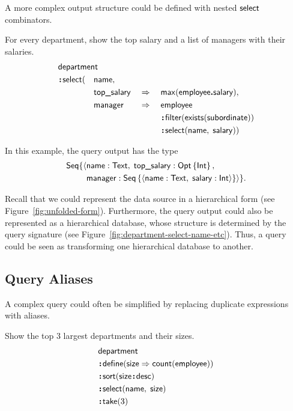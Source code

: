 A more complex output structure could be defined with nested $\textup{\textsf{select}}$ combinators.

\begin{demo}
    \label{ex:department-select-name-etc}
    For every department, show the top salary and a list of managers with their
    salaries.
    \begin{alignat*}{4}
        & \Department\hidewidth && && && \\
        & \Apply\Select( && \Name, && && \\
            & && \TopSalary && \As\; && \Max(\Employee\To\Salary), \\
            & && \Manager && \As\; && \Employee \\
            & && && && \Apply\Filter(\Exists(\Subordinate)) \\
            & && && && \Apply\Select(\Name,\; \Salary))
    \end{alignat*}
\end{demo}

In this example, the query output has the type
\begin{align*}
    \textup{\textsf{Seq}}\{\langle & \textup{\textsf{name}} : \textup{\textsf{Text}},\; \textup{\textsf{top\_salary}} : \textup{\textsf{Opt}}\left\{\textup{\textsf{Int}}\right\}, \\
    & \textup{\textsf{manager}} : \textup{\textsf{Seq}}\left\{\langle \textup{\textsf{name}} : \textup{\textsf{Text}},\; \textup{\textsf{salary}} : \textup{\textsf{Int}} \rangle\right\} \rangle\}.
\end{align*}

Recall that we could represent the data source in a hierarchical form (see
Figure~\ref{fig:unfolded-form}).  Furthermore, the query output could also be
represented as a hierarchical database, whose structure is determined by the
query signature (see Figure~\ref{fig:department-select-name-etc}).  Thus,
a query could be seen as transforming one hierarchical database to another.



\subsection*{Query Aliases}

A complex query could often be simplified by replacing duplicate expressions
with aliases.

\begin{demo}
    \label{ex:department-define-size}
    Show the top 3 largest departments and their sizes.
    \begin{align*}
        & \Department \\
        & \Apply\Define(\Size\As\Count(\Employee)) \\
        & \Apply\Sort(\Size\Apply\Desc) \\
        & \Apply\Select(\Name,\; \Size) \\
        & \Apply\Take(3)
    \end{align*}
\end{demo}


